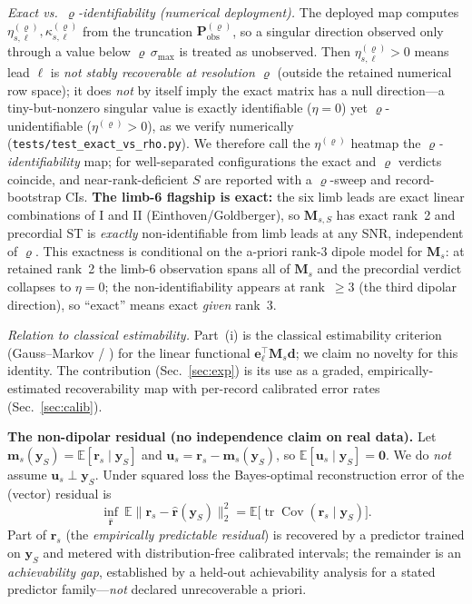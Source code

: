 \noindent\emph{Exact vs.\ $\varrho$-identifiability (numerical deployment).} The deployed map
computes $\eta^{(\varrho)}_{s,\ell},\kappa^{(\varrho)}_{s,\ell}$ from the truncation
$\bm P_{\mathrm{obs}}^{(\varrho)}$, so a singular direction observed only through a value below
$\varrho\,\sigma_{\max}$ is treated as unobserved. Then $\eta^{(\varrho)}_{s,\ell}>0$ means lead
$\ell$ is \emph{not stably recoverable at resolution $\varrho$} (outside the retained numerical
row space); it does \emph{not} by itself imply the exact matrix has a null direction---a
tiny-but-nonzero singular value is exactly identifiable ($\eta=0$) yet $\varrho$-unidentifiable
($\eta^{(\varrho)}>0$), as we verify numerically (\texttt{tests/test\_exact\_vs\_rho.py}). We therefore call the
$\eta^{(\varrho)}$ heatmap the \emph{$\varrho$-identifiability} map; for well-separated
configurations the exact and $\varrho$ verdicts coincide, and near-rank-deficient $S$ are
reported with a $\varrho$-sweep and record-bootstrap CIs. \textbf{The limb-6 flagship is exact:}
the six limb leads are exact linear combinations of I and II (Einthoven/Goldberger), so
$\bm M_{s,S}$ has exact rank~2 and precordial ST is \emph{exactly} non-identifiable from limb
leads at any SNR, independent of $\varrho$. This exactness is conditional on the a-priori rank-3
dipole model for $\bm M_s$: at retained rank~2 the limb-6 observation spans all of $\bm M_s$ and
the precordial verdict collapses to $\eta{=}0$; the non-identifiability appears at rank~$\ge$3
(the third dipolar direction), so ``exact'' means exact \emph{given} rank~3.

\noindent\emph{Relation to classical estimability.} Part~(i) is the classical estimability
criterion (Gauss--Markov / \cite{scheffe1959anova}) for the linear functional
$\bm e_\ell^{\top}\bm M_s\bm d$; we claim no novelty for this identity. The contribution
(Sec.~\ref{sec:exp}) is its use as a graded, empirically-estimated recoverability map with
per-record calibrated error rates (Sec.~\ref{sec:calib}).

\noindent\textbf{The non-dipolar residual (no independence claim on real data).}
Let $\bm m_s(\bm y_S)=\mathbb E[\bm r_s\mid\bm y_S]$ and
$\bm u_s=\bm r_s-\bm m_s(\bm y_S)$, so $\mathbb E[\bm u_s\mid\bm y_S]=\bm 0$. We do
\emph{not} assume $\bm u_s\perp\bm y_S$. Under squared loss the Bayes-optimal reconstruction
error of the (vector) residual is
\[
\inf_{\hat{\bm r}}\ \mathbb E\big\|\bm r_s-\hat{\bm r}(\bm y_S)\big\|_2^2
=\mathbb E\big[\operatorname{tr}\operatorname{Cov}(\bm r_s\mid\bm y_S)\big].
\]
Part of $\bm r_s$ (the \emph{empirically predictable residual}) is recovered by a
predictor trained on $\bm y_S$ and metered with distribution-free calibrated intervals;
the remainder is an \emph{achievability gap}, established by a held-out achievability
analysis for a stated predictor family---\emph{not} declared unrecoverable a priori.

